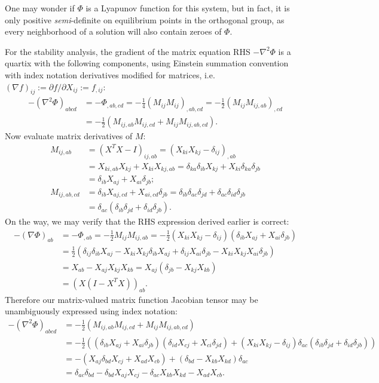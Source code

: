 \documentclass[12pt]{article}
\begin{document}
One may wonder if $\Phi$ is a Lyapunov function for this system, but in fact, it is only positive \emph{semi}-definite on equilibrium points in the orthogonal group, as every neighborhood of a solution will also contain zeroes of $\Phi.$

For the stability analysis, the gradient of the matrix equation RHS $-\nabla^2 \Phi$ is a quartix with the following components, using Einstein summation convention with index notation derivatives modified for matrices, i.e. $(\nabla f)_{ij} := \partial f/\partial X_{ij} := f_{,ij}$:
\begin{align*}
    -{(\nabla^2 \Phi)}_{abcd} &= -\Phi_{,ab,cd} = -\frac{1}{4} (M_{ij} M_{ij})_{,ab,cd} = -\frac{1}{2} (M_{ij} M_{ij,ab})_{,cd} \\
        &= -\frac{1}{2} (M_{ij,ab} M_{ij,cd} + M_{ij} M_{ij,ab,cd}).
\end{align*}
Now evaluate matrix derivatives of $M$:
\begin{align*}
    M_{ij,ab} &= (X^T X - I)_{ij,ab} = (X_{ki} X_{kj} - \delta_{ij})_{,ab} \\
        &= X_{ki,ab} X_{kj} + X_{ki} X_{kj,ab} = \delta_{ka} \delta_{ib} X_{kj} + X_{ki} \delta_{ka} \delta_{jb} \\
        &= \delta_{ib} X_{aj} + X_{ai} \delta_{jb}; \\
    M_{ij,ab,cd} &= \delta_{ib} X_{aj,cd} + X_{ai,cd} \delta_{jb} = \delta_{ib} \delta_{ac} \delta_{jd} +  \delta_{ac} \delta_{id} \delta_{jb} \\
        &= \delta_{ac} (\delta_{ib} \delta_{jd} + \delta_{id} \delta_{jb}).
\end{align*}
On the way, we may verify that the RHS expression derived earlier is correct:
\begin{align*}
    -{(\nabla \Phi)}_{ab} &= -\Phi_{,ab} = -\frac{1}{2} M_{ij} M_{ij,ab} = -\frac{1}{2} (X_{ki} X_{kj} - \delta_{ij})(\delta_{ib} X_{aj} + X_{ai} \delta_{jb}) \\
        &= \frac{1}{2} (\delta_{ij} \delta_{ib} X_{aj} - X_{ki} X_{kj} \delta_{ib} X_{aj} + \delta_{ij} X_{ai} \delta_{jb} - X_{ki} X_{kj} X_{ai} \delta_{jb}) \\
        &= X_{ab} - X_{aj} X_{kj} X_{kb} = X_{aj} (\delta_{jb} - X_{kj} X_{kb}) \\
        &= (X(I - X^T X))_{ab}.
\end{align*}
Therefore our matrix-valued matrix function Jacobian tensor may be unambiguously expressed using index notation:
\begin{align*}
    -{(\nabla^2 \Phi)}_{abcd} &= -\frac{1}{2} (M_{ij,ab} M_{ij,cd} + M_{ij} M_{ij,ab,cd}) \\
        &= -\frac{1}{2} ((\delta_{ib} X_{aj} + X_{ai} \delta_{jb}) (\delta_{id} X_{cj} + X_{ci} \delta_{jd}) + (X_{ki} X_{kj} - \delta_{ij}) \delta_{ac} (\delta_{ib} \delta_{jd} + \delta_{id} \delta_{jb})) \\
        &= -(X_{aj} \delta_{bd} X_{cj} + X_{ad} X_{cb}) + (\delta_{bd} - X_{kb} X_{kd}) \delta_{ac} \\
        &= \delta_{ac} \delta_{bd} -\delta_{bd} X_{aj} X_{cj} - \delta_{ac} X_{kb} X_{kd} - X_{ad} X_{cb}.
\end{align*}
\end{document}
